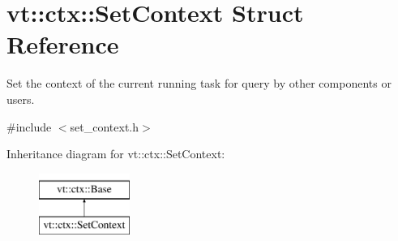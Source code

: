 \hypertarget{structvt_1_1ctx_1_1_set_context}{}\section{vt\+:\+:ctx\+:\+:Set\+Context Struct Reference}
\label{structvt_1_1ctx_1_1_set_context}


Set the context of the current running task for query by other components or users.  




{\ttfamily \#include $<$set\+\_\+context.\+h$>$}

Inheritance diagram for vt\+:\+:ctx\+:\+:Set\+Context\+:\begin{figure}[H]
\begin{center}
\leavevmode
\includegraphics[height=2.000000cm]{structvt_1_1ctx_1_1_set_context}
\end{center}
\end{figure}
